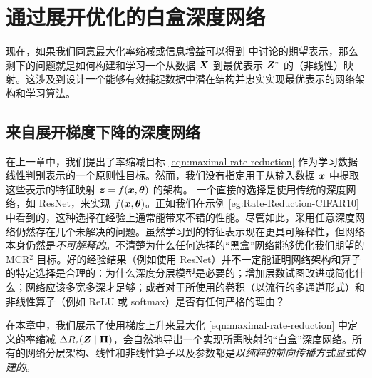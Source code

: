 \documentclass[../../book-main.tex]{subfiles}
\begin{document}
\section{通过展开优化的白盒深度网络}\label{sec:chap4-white-box-model-via-unrolling}


现在，如果我们同意最大化率缩减或信息增益可以得到  中讨论的期望表示，那么剩下的问题就是如何构建和学习一个从数据 $\bm{X}$ 到最优表示 $\bm{Z}^*$ 的（非线性）映射。这涉及到设计一个能够有效捕捉数据中潜在结构并忠实实现最优表示的网络架构和学习算法。


\subsection{来自展开梯度下降的深度网络}

在上一章中，我们提出了率缩减目标 \eqref{eqn:maximal-rate-reduction} 作为学习数据线性判别表示的一个原则性目标。然而，我们没有指定用于从输入数据 $\bm{x}$ 中提取这些表示的特征映射 $\bm{z} = f(\bm{x}, \bm \theta)$ 的架构。
一个直接的选择是使用传统的深度网络，如 ResNet，来实现 $f(\bm{x}, \bm \theta)$。正如我们在示例 \ref{eg:Rate-Reduction-CIFAR10} 中看到的，这种选择在经验上通常能带来不错的性能。尽管如此，采用任意深度网络仍然存在几个未解决的问题。虽然学习到的特征表示现在更具可解释性，但网络本身仍然是{\em 不可解释的}。不清楚为什么任何选择的“黑盒”网络能够优化我们期望的 MCR$^2$ 目标。好的经验结果（例如使用 ResNet）并不一定能证明网络架构和算子的特定选择是合理的：为什么深度分层模型是必要的；增加层数试图改进或简化什么；网络应该多宽多深才足够；或者对于所使用的卷积（以流行的多通道形式）和非线性算子（例如 ReLU 或 softmax）是否有任何严格的理由？

在本章中，我们展示了使用梯度上升来最大化 \eqref{eqn:maximal-rate-reduction} 中定义的率缩减 $\Delta R_{\epsilon}(\bm{Z} \mid \bm \Pi)$，会自然地导出一个实现所需映射的“白盒”深度网络。所有的网络分层架构、线性和非线性算子以及参数都是{\em 以纯粹的前向传播方式显式构建的}。
\end{document}
